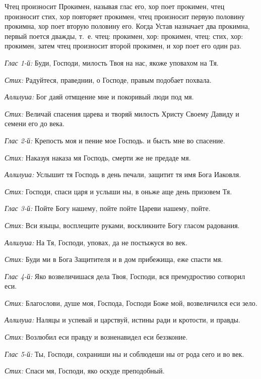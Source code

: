 \begin{mymulticols}
{Чтец произносит Прокимен, называя глас его, хор поет прокимен, чтец произносит стих, хор повторяет прокимен, чтец произносит первую половину прокимна, хор поет вторую половину его. Когда Устав назначает два прокимна, первый поется дважды, т.~е. чтец: прокимен, хор: прокимен, чтец: стих, хор: прокимен, затем чтец произносит второй прокимен, и хор поет его один раз.}


{\itshape Глас 1-й:} Буди, Господи, милость Твоя на нас, якоже уповахом на Тя.

{\itshape Стих:} Радуйтеся, праведнии, о Господе, правым подобает похвала.

{\itshape Аллилуиа:} Бог даяй отмщение мне и покоривый люди под мя.

{\itshape Стих:} Величай спасения царева и творяй милость Христу Своему Давиду и семени его до века.

{\itshape Глас 2-й:} Крепость моя и пение мое Господь. и бысть мне во спасение.

{\itshape Стих:} Наказуя наказа мя Господь, смерти же не предаде мя.

{\itshape Аллилуиа:} Услышит тя Господь в день печали, защитит тя имя Бога Иаковля.

{\itshape Стих:} Господи, спаси царя и услыши ны, в оньже аще день призовем Тя.

{\itshape Глас 3-й:} Пойте Богу нашему, пойте пойте Цареви нашему, пойте.

{\itshape Стих:} Вси языцы, восплещите руками, воскликните Богу гласом радования.

{\itshape Аллилуиа:} На Тя, Господи, уповах, да не постыжуся во век.

{\itshape Стих:} Буди ми в Бога Защитителя и в дом прибежища, еже спасти мя.

{\itshape Глас 4-й:} Яко возвеличишася дела Твоя, Господи, вся премудростию сотворил еси.

{\itshape Стих:} Благослови, душе моя, Господа, Господи Боже мой, возвеличился еси зело.

{\itshape Аллилуиа:} Наляцы и успевай и царствуй, истины ради и кротости, и правды.

{\itshape Стих:} Возлюбил еси правду и возненавидел еси беззконие.

{\itshape Глас 5-й:} Ты, Господи, сохраниши ны и соблюдеши ны от рода сего и во век.

{\itshape Стих:} Спаси мя, Господи, яко оскуде преподобный.


\end{mymulticols}
